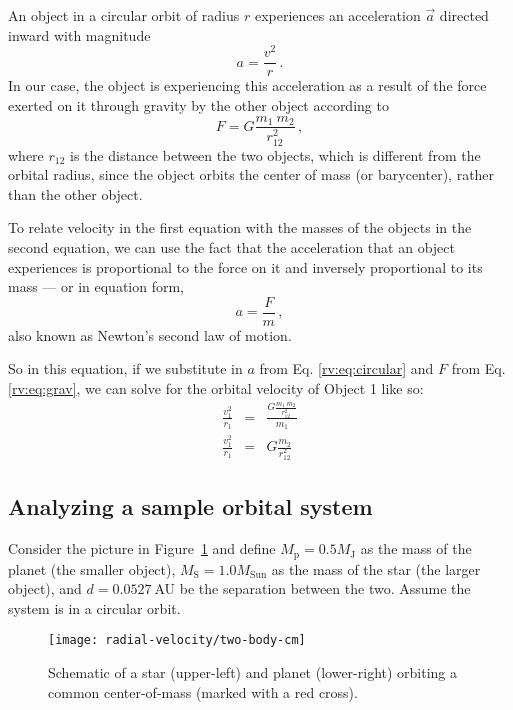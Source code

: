 An object in a circular orbit of radius $r$ experiences an acceleration $\vec{a}$ directed inward with magnitude
\begin{equation}\label{rv:eq:circular}
 a = \frac{v^2}{r} \,.
\end{equation}
In our case, the object is experiencing this acceleration as a result of the force exerted on it through gravity by the other object according to
\begin{equation}\label{rv:eq:grav}
 F = G \frac{m_1 \: m_2}{r_{12}^2} \,,
\end{equation}
where $r_{12}$ is the distance between the two objects, which is different from the orbital radius, since the object orbits the center of mass (or barycenter), rather than the other object.

To relate velocity in the first equation with the masses of the objects in the second equation, we can use the fact that the acceleration that an object experiences is proportional to the force on it and inversely proportional to its mass --- or in equation form,
\begin{equation}\label{rv:eq:n2l}
 a = \frac{F}{m} \,,
\end{equation}
also known as Newton's second law of motion.

So in this equation, if we substitute in $a$ from Eq. \ref{rv:eq:circular} and $F$ from Eq. \ref{rv:eq:grav}, we can solve for the orbital velocity of Object 1 like so:
\begin{eqnarray}
 \frac{v_1^2}{r_1} &=& \frac{G \frac{m_1 \: m_2}{r_{12}^2}}{m_1} \\
 \frac{v_1^2}{r_1} &=& G \frac{m_2}{r_{12}^2}
\end{eqnarray}

\subsection{Analyzing a sample orbital system}

Consider the picture in Figure~\ref{rv:fig:two-body-cm} and define $M_\textrm{p} = 0.5 M_\textrm{J}$ as the mass of the planet (the smaller object),  $M_\textrm{S} = 1.0 M_\textrm{Sun}$ as the mass of the star (the larger object), and $d = 0.0527\:$AU be the separation between the two. Assume the system is in a circular orbit.

\begin{figure}
	\centering
	\texttt{[image: radial-velocity/two-body-cm]}
	\caption{Schematic of a star (upper-left) and planet (lower-right) orbiting a common center-of-mass (marked with a red cross).}\label{rv:fig:two-body-cm}
\end{figure}

